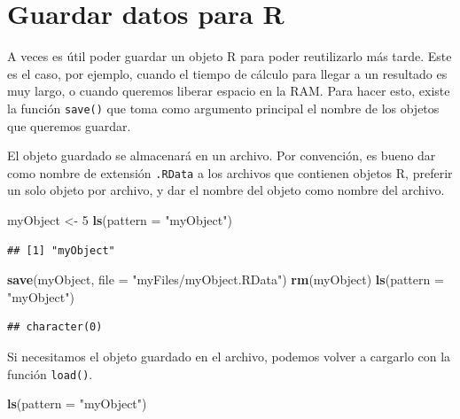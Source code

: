 \documentclass[
]{book}
\newenvironment{Shaded}{\begin{snugshade}}{\end{snugshade}}
\newcommand{\DataTypeTok}[1]{\textcolor[rgb]{0.13,0.29,0.53}{#1}}
\newcommand{\DecValTok}[1]{\textcolor[rgb]{0.00,0.00,0.81}{#1}}
\newcommand{\KeywordTok}[1]{\textcolor[rgb]{0.13,0.29,0.53}{\textbf{#1}}}
\newcommand{\NormalTok}[1]{#1}
\newcommand{\StringTok}[1]{\textcolor[rgb]{0.31,0.60,0.02}{#1}}
\begin{document}
\hypertarget{l016save}{%
\section{Guardar datos para R}\label{l016save}}

A veces es útil poder guardar un objeto R para poder reutilizarlo más tarde. Este es el caso, por ejemplo, cuando el tiempo de cálculo para llegar a un resultado es muy largo, o cuando queremos liberar espacio en la RAM. Para hacer esto, existe la función \texttt{save()} que toma como argumento principal el nombre de los objetos que queremos guardar.

El objeto guardado se almacenará en un archivo. Por convención, es bueno dar como nombre de extensión \texttt{.RData} a los archivos que contienen objetos R, preferir un solo objeto por archivo, y dar el nombre del objeto como nombre del archivo.

\begin{Shaded}
\begin{Highlighting}[]
\NormalTok{myObject <-}\StringTok{ }\DecValTok{5}
\KeywordTok{ls}\NormalTok{(}\DataTypeTok{pattern =} \StringTok{"myObject"}\NormalTok{)}
\end{Highlighting}
\end{Shaded}

\begin{verbatim}
## [1] "myObject"
\end{verbatim}

\begin{Shaded}
\begin{Highlighting}[]
\KeywordTok{save}\NormalTok{(myObject, }\DataTypeTok{file =} \StringTok{"myFiles/myObject.RData"}\NormalTok{)}
\KeywordTok{rm}\NormalTok{(myObject)}
\KeywordTok{ls}\NormalTok{(}\DataTypeTok{pattern =} \StringTok{"myObject"}\NormalTok{)}
\end{Highlighting}
\end{Shaded}

\begin{verbatim}
## character(0)
\end{verbatim}

Si necesitamos el objeto guardado en el archivo, podemos volver a cargarlo con la función \texttt{load()}.

\begin{Shaded}
\begin{Highlighting}[]
\KeywordTok{ls}\NormalTok{(}\DataTypeTok{pattern =} \StringTok{"myObject"}\NormalTok{)}
\end{Highlighting}
\end{Shaded}
\end{document}
